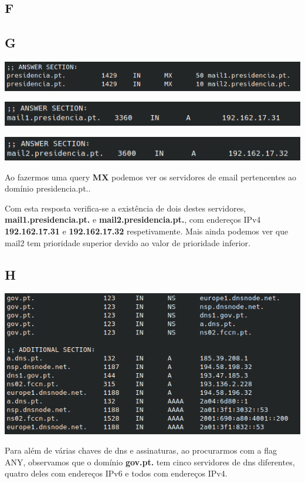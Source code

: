 \documentclass[size=11pt]{report}
\begin{document}
        \subsection*{F}
        \pagebreak
        \subsection*{G}
            \noindent
            \includegraphics[width=\textwidth]{images/dig_presidencia.png}
            \par
            \noindent
            \includegraphics[width=\textwidth]{images/mail1_a.png}
            \par
            \noindent
            \includegraphics[width=\textwidth]{images/mail2_a.png}
            \par
            Ao fazermos uma query \textbf{MX} podemos ver os servidores de email pertencentes ao domínio presidencia.pt..\par
            Com esta resposta verifica-se a existência de dois destes servidores, \linebreak \textbf{mail1.presidencia.pt.} e \textbf{mail2.presidencia.pt.}, com endereços IPv4 \linebreak \textbf{192.162.17.31} e \textbf{192.162.17.32} respetivamente.
            Mais ainda podemos ver que mail2 tem prioridade superior devido ao valor de prioridade inferior.
        \subsection*{H}
            \noindent
            \includegraphics[width=\textwidth]{images/dig_gov_any.png}
            \par
            Para além de várias chaves de dns e assinaturas, ao procurarmos com a flag ANY, observamos que o domínio \textbf{gov.pt.} tem cinco servidores de dns diferentes, quatro deles com endereços IPv6 e todos com endereços IPv4.
\end{document}
